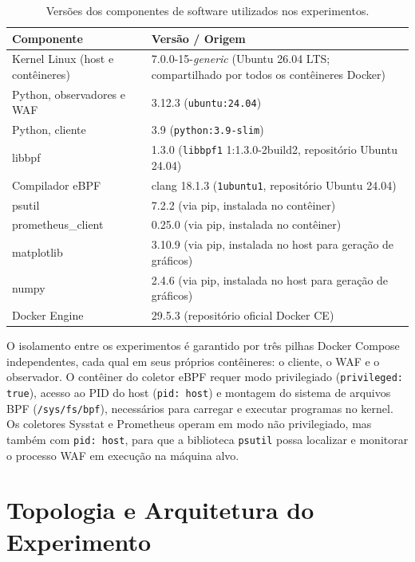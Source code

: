 \begin{table}[htbp]
\centering
\caption{Versões dos componentes de software utilizados nos experimentos.}
\label{tab:versoes_software}
\begin{tabularx}{\textwidth}{lX}
\hline
\textbf{Componente} & \textbf{Versão / Origem} \\
\hline
Kernel Linux (host e contêineres) & 7.0.0-15-\textit{generic} (Ubuntu 26.04 LTS; compartilhado por todos os contêineres Docker) \\
Python, observadores e WAF & 3.12.3 (\texttt{ubuntu:24.04}) \\
Python, cliente           & 3.9 (\texttt{python:3.9-slim}) \\
libbpf                     & 1.3.0 (\texttt{libbpf1} 1:1.3.0-2build2, repositório Ubuntu 24.04) \\
Compilador eBPF            & clang 18.1.3 (\texttt{1ubuntu1}, repositório Ubuntu 24.04) \\
psutil                     & 7.2.2 (via pip, instalada no contêiner) \\
prometheus\_client         & 0.25.0 (via pip, instalada no contêiner) \\
matplotlib                 & 3.10.9 (via pip, instalada no host para geração de gráficos) \\
numpy                      & 2.4.6 (via pip, instalada no host para geração de gráficos) \\
Docker Engine              & 29.5.3 (repositório oficial Docker CE) \\
\hline
\end{tabularx}
\end{table}

O isolamento entre os experimentos é garantido por três pilhas Docker Compose independentes, cada qual em seus próprios contêineres: o cliente, o WAF e o observador. O contêiner do coletor eBPF requer modo privilegiado (\texttt{privileged: true}), acesso ao PID do host (\texttt{pid: host}) e montagem do sistema de arquivos BPF (\texttt{/sys/fs/bpf}), necessários para carregar e executar programas no kernel. Os coletores Sysstat e Prometheus operam em modo não privilegiado, mas também com \texttt{pid: host}, para que a biblioteca \texttt{psutil} possa localizar e monitorar o processo WAF em execução na máquina alvo.

\section{Topologia e Arquitetura do Experimento}

